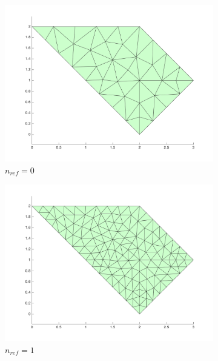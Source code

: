 \documentclass[10pt]{article}
\begin{document}
\begin{figure}[H]
        \centering
        \begin{subfigure}[b]{0.35\textwidth}
                \centering
                \includegraphics[width=\textwidth]{refine-B0.png}
                \caption{\(n_{ref}=0\)}
        \end{subfigure}%
        \begin{subfigure}[b]{0.35\textwidth}
                \centering
                \includegraphics[width=\textwidth]{refine-B1.png}
                \caption{\(n_{ref}=1\)}
        \end{subfigure}%
        \begin{subfigure}[b]{0.35\textwidth}
                \centering

\end{subfigure}
\end{figure}
\end{document}
